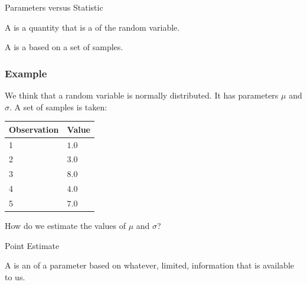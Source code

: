\begin{frame}{Parameters versus Statistic}

  \begin{definition}[Parameter]
    A  is a quantity that is a 
    of the random variable.
  \end{definition}

  \begin{definition}[Statistic]
    A  is a  based on a set
    of samples.
  \end{definition}

\end{frame}




\begin{frame}
  \frametitle{Example}

  We think that a random variable is normally distributed. It has
  parameters $\mu$ and   $\sigma$. A set of samples is taken: \\ [10pt]
  \begin{tabular}{l|l}
    Observation & Value \\ \hline
    1 & $1.0$ \\ 
    2 & $3.0$ \\
    3 & $8.0$ \\
    4 & $4.0$ \\
    5 & $7.0$
  \end{tabular}

  How do we estimate the values of $\mu$ and $\sigma$?

\end{frame}


\begin{frame}{Point Estimate}

  \begin{definition}
    A  is an  of a
    parameter based on whatever, limited, information that is
    available to us.
  \end{definition}

  \vfill


  \vfill
\end{frame}



